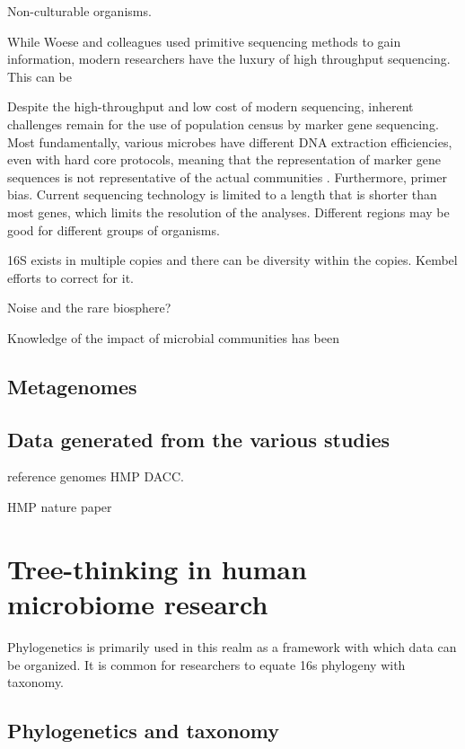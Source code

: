 \documentclass{amsart}
\begin{document}
Non-culturable organisms.

While Woese and colleagues used primitive sequencing methods to gain information, modern researchers have the luxury of high throughput sequencing.
This can be

Despite the high-throughput and low cost of modern sequencing, inherent challenges remain for the use of population census by marker gene sequencing.
Most fundamentally, various microbes have different DNA extraction efficiencies, even with hard core protocols, meaning that the representation of marker gene sequences is not representative of the actual communities \cite{morganEaInVitroSimulatedMetagenome10}.
Furthermore, primer bias.
Current sequencing technology is limited to a length that is shorter than most genes, which limits the resolution of the analyses.
Different regions may be good for different groups of organisms.

16S exists in multiple copies and there can be diversity within the copies.
Kembel efforts to correct for it.

\cite{case2007rpob}

Noise and the rare biosphere?

Knowledge of the impact of microbial communities has been

\subsection{Metagenomes}


\subsection{Data generated from the various studies}
reference genomes
HMP DACC.

HMP nature paper
\cite{methe2012framework}


\section{Tree-thinking in human microbiome research}

Phylogenetics is primarily used in this realm as a framework with which data can be organized.
It is common for researchers to equate 16s phylogeny with taxonomy.

\subsection{Phylogenetics and taxonomy}
\end{document}
